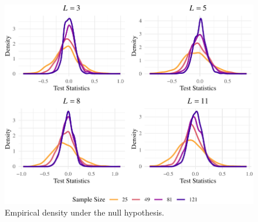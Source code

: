 \documentclass[remotesensing,article,submit,moreauthors,pdftex]{Definitions/mdpi}
\begin{document}
\begin{figure}[hbt]
\includegraphics[width=0.8\linewidth]{Identifying-Heterogeneity-in-SAR-Data-with-New-Test-Statistics_files/figure-latex/Plot_density-1} \caption{Empirical density  under the null hypothesis.}\label{fig:Plot_density}
\end{figure}
\end{document}

